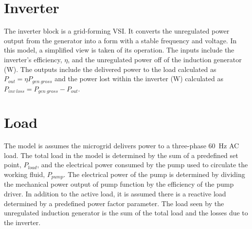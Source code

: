 \begin{comment}
First the inductive and capacitive reactances of the rotor, stator, and external excitation capacitors are calculated at the rated frequency of the machine, along with the equivalent load resistance for the given input voltage. Next, the electrical frequency is calculated based off the real portion of the admittance balance equations. With the frequency the machine slip can be determined as well. Next, the imaginary portion of the admittance balance equation can be used to solve for the core reactance. Internal voltage of the machine is then interpolated from the core reactance based off of the magnetization curves. The new line voltage is determined as well to feed back into the next iteration of the function.

With all components of the machine known, the power output and losses can be calculated in the same manner as the regulated induction generator seen above. The power generated, $P_{gen\ gross}$, is fed into the input of the inverter block and the losses, $P_{gen\ loss}$ are used in the feedback control.
\end{comment}

\section{Inverter}
The inverter block is a grid-forming VSI. It converts the unregulated power output from the generator into a form with a stable frequency and voltage. In this model, a simplified view is taken of its operation. The inputs include the inverter's efficiency, $\eta$, and the unregulated power off of the induction generator (\si{\watt}). The outputs include the delivered power to the load calculated as $P_{out} = \eta P_{gen\ gross}$ and the power lost within the inverter (\si{\watt}) calculated as $P_{inv\ loss} = P_{gen\ gross} - P_{out}$. 

\section{Load}
The model is assumes the microgrid delivers power to a three-phase \SI{60}{\hertz} AC load. The total load in the model is determined by the sum of a predefined set point, $P_{load}$, and the electrical power consumed by the pump used to circulate the working fluid, $P_{pump}$. The electrical power of the pump is determined by dividing the mechanical power output of pump function by the efficiency of the pump driver. In addition to the active load, it is assumed there is a reactive load determined by a predefined power factor parameter. 
The load seen by the unregulated induction generator is the sum of the total load and the losses due to the inverter. 

